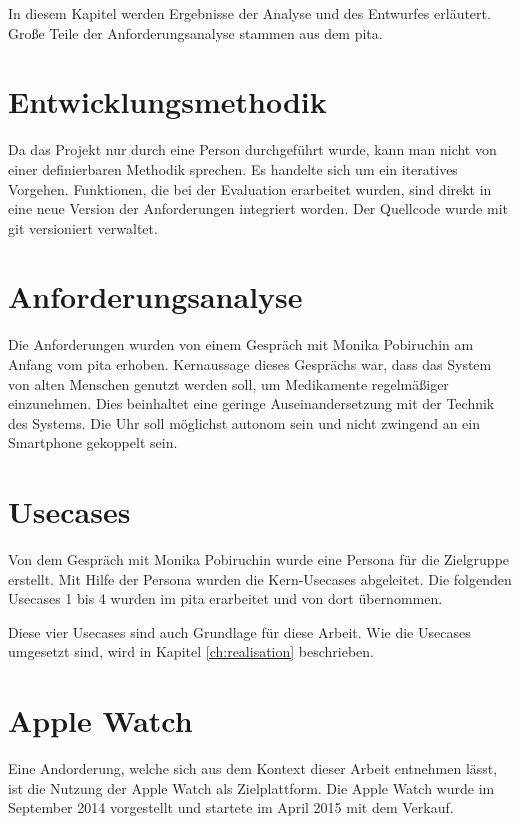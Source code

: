 In diesem Kapitel werden Ergebnisse der Analyse und des Entwurfes erläutert. Große Teile der Anforderungsanalyse stammen aus dem \gls{pita}.
\section{Entwicklungsmethodik}
Da das Projekt nur durch eine Person durchgeführt wurde, kann man nicht von einer definierbaren Methodik sprechen. Es handelte sich um ein iteratives Vorgehen. Funktionen, die bei der Evaluation erarbeitet wurden, sind direkt in eine neue Version der Anforderungen integriert worden. Der Quellcode wurde mit \gls{git} versioniert verwaltet.
\section{Anforderungsanalyse}
Die Anforderungen wurden von einem Gespräch mit Monika Pobiruchin am Anfang vom \gls{pita} erhoben. Kernaussage dieses Gesprächs war, dass das System von alten Menschen genutzt werden soll, um Medikamente regelmäßiger einzunehmen. Dies beinhaltet eine geringe Auseinandersetzung mit der Technik des Systems. Die Uhr soll möglichst autonom sein und nicht zwingend an ein Smartphone gekoppelt sein.

\section{Usecases} 
Von dem Gespräch mit Monika Pobiruchin wurde eine Persona für die Zielgruppe erstellt.
Mit Hilfe der Persona wurden die Kern-Usecases abgeleitet. Die folgenden Usecases 1 bis 4 wurden im \gls{pita} erarbeitet und von dort übernommen. 

Diese vier Usecases sind auch Grundlage für diese Arbeit. Wie die Usecases umgesetzt sind, wird in Kapitel \ref{ch:realisation} beschrieben.

\section{Apple Watch}
\label{ch:apple-watch}
Eine Andorderung, welche sich aus dem Kontext dieser Arbeit entnehmen lässt, ist die Nutzung der Apple Watch als Zielplattform. Die Apple Watch wurde im September 2014 vorgestellt und startete im April 2015 mit dem Verkauf.
